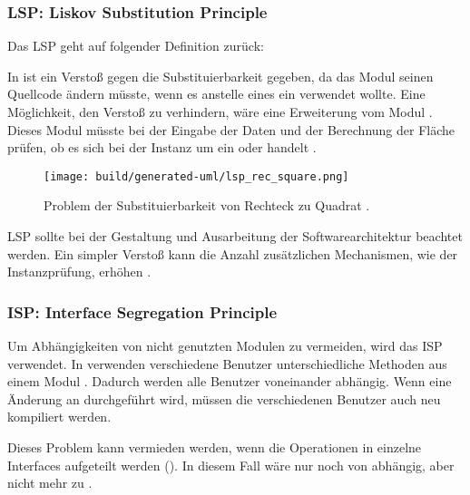 \subsubsection{LSP: Liskov Substitution Principle}

Das \ac{LSP} geht auf folgender Definition zurück: 

In  ist ein Verstoß gegen die Substituierbarkeit  gegeben, da das Modul  seinen Quellcode ändern müsste, wenn es anstelle eines  ein  verwendet wollte. Eine Möglichkeit, den Verstoß zu verhindern, wäre eine Erweiterung vom Modul . Dieses Modul müsste \zb bei der Eingabe der Daten und der Berechnung der Fläche prüfen, ob es sich bei der Instanz um ein  oder  handelt \citep[vgl.][79]{martin2018}.

\begin{figure}
  \centering
  \texttt{[image: build/generated-uml/lsp\_rec\_square.png]}
   \caption{Problem der Substituierbarkeit von Rechteck zu Quadrat \citep[vgl.][79]{martin2018}.}
   \label{fig:lsp_rec_square}
\end{figure}

\ac{LSP} sollte bei der Gestaltung und Ausarbeitung der Softwarearchitektur beachtet werden. Ein simpler Verstoß kann die Anzahl zusätzlichen Mechanismen, wie \zb der Instanzprüfung, erhöhen \citep[vgl.][82]{martin2018}.

\subsubsection{ISP: Interface Segregation Principle}

Um Abhängigkeiten von nicht genutzten Modulen zu vermeiden, wird das \ac{ISP} verwendet. In  verwenden verschiedene Benutzer unterschiedliche Methoden aus einem Modul . Dadurch werden alle Benutzer voneinander abhängig. Wenn eine Änderung an  durchgeführt wird, müssen die verschiedenen Benutzer auch neu kompiliert werden.

Dieses Problem kann vermieden werden, wenn die Operationen in einzelne Interfaces aufgeteilt werden (). In diesem Fall wäre  nur noch von  abhängig, aber nicht mehr zu  \citep[vgl.][85]{martin2018}.


